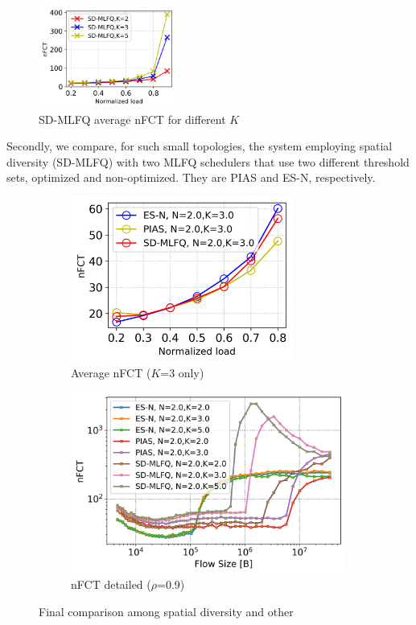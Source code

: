 \begin{figure}[!tb]
	\centering
	\includegraphics[width=0.4\textwidth]{Chapter4/Figures/sd-larger-topology}
	\caption{SD-MLFQ average nFCT for different $K$}
	\label{fig:sdmlfq_varying_K}
\end{figure}%
Secondly, we compare, for such small topologies, the system employing spatial diversity (SD-MLFQ) with two MLFQ schedulers that use two different threshold sets, optimized and non-optimized. They are PIAS and ES-N, respectively.
\begin{figure}
	\centering
	\begin{subfigure}{.5\textwidth}
		\centering
		\includegraphics[width=0.8\textwidth]{Chapter4/Figures/sd-final-comparison-fct-vs-load}
		\caption{Average nFCT ($K$=3 only)}
		\label{fig:sd-final}
	\end{subfigure}%
	\hfill
	\begin{subfigure}{.5\textwidth}
		\centering
		\includegraphics[width=0.99\textwidth]{Chapter4/Figures/sd-final-comparison}
		\caption{nFCT detailed ($\rho$=0.9)}
		\label{fig:sd-final-detailed}
	\end{subfigure}%
	\caption{Final comparison among spatial diversity and other}
	\label{fig:sd-defeat}
\end{figure}%
